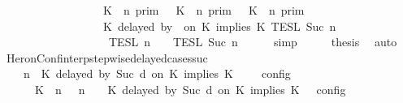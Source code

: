 \begin{isabellebody}
\ \ \ \ \ \ \ \ \ \ \ \ \ \ \ \ {\isasyminter}\ {\isacharparenleft}{\isasymlbrakk}\ K\ {\isasymnot}{\isasymUp}\ n\ {\isasymrbrakk}\isactrlsub p\isactrlsub r\isactrlsub i\isactrlsub m\ {\isasymunion}\ {\isacharparenleft}{\isasymlbrakk}\ K\ {\isasymUp}\ n\ {\isasymrbrakk}\isactrlsub p\isactrlsub r\isactrlsub i\isactrlsub m\ {\isasyminter}\ {\isasymlbrakk}\ K\ {\isasymUp}\ n\ {\isasymrbrakk}\isactrlsub p\isactrlsub r\isactrlsub i\isactrlsub m{\isacharparenright}{\isacharparenright}\isanewline
\ \ \ \ \ \ \ \ \ \ \ \ \ \ \ \ {\isasyminter}\ {\isasymlbrakk}\ K\ delayed\ by\ {}\ on\ K\ implies\ K\ {\isasymrbrakk}\isactrlsub T\isactrlsub E\isactrlsub S\isactrlsub L\isactrlbsup {\isasymge}\ Suc\ n\isactrlesup \isanewline
\ \ \ \ \ \ \ \ \ \ \ \ \ \ \ \ {\isasyminter}\ {\isasymlbrakk}{\isasymlbrakk}\ {\isasymPsi}\ {\isasymrbrakk}{\isasymrbrakk}\isactrlsub T\isactrlsub E\isactrlsub S\isactrlsub L\isactrlbsup {\isasymge}\ n\isactrlesup \ {\isasyminter}\ {\isasymlbrakk}{\isasymlbrakk}\ {\isasymPhi}\ {\isasymrbrakk}{\isasymrbrakk}\isactrlsub T\isactrlsub E\isactrlsub S\isactrlsub L\isactrlbsup {\isasymge}\ Suc\ n\isactrlesup {\isacartoucheclose}\isanewline
\ \ \ \ \isamarkupfalse%
\ simp\isanewline
\ \ \isamarkupfalse%
\ \isamarkupfalse%
\ {\isacharquery}thesis\ \isamarkupfalse%
\ auto\isanewline
{}\isamarkupfalse%
%
\endisatagproof
{\isafoldproof}%
%
\isadelimproof
\isanewline
%
\endisadelimproof
\isanewline
{}\isamarkupfalse%
\ HeronConf{\isacharunderscore}interp{\isacharunderscore}stepwise{\isacharunderscore}delayed{\isacharunderscore}cases{\isacharunderscore}suc{\isacharcolon}\isanewline
\ \ {\isacartoucheopen}{\isasymlbrakk}\ {\isasymGamma}{\isacharcomma}\ n\ {\isasymturnstile}\ {\isacharparenleft}{\isacharparenleft}K\ delayed\ by\ {\isacharparenleft}Suc\ d{\isacharparenright}\ on\ K\ implies\ K\ {\isacharhash}\ {\isasymPsi}{\isacharparenright}\ {\isasymtriangleright}\ {\isasymPhi}\ {\isasymrbrakk}\isactrlsub c\isactrlsub o\isactrlsub n\isactrlsub f\isactrlsub i\isactrlsub g\isanewline
\ \ \ \ {\isacharequal}\ {\isasymlbrakk}\ {\isacharparenleft}{\isacharparenleft}K\ {\isasymnot}{\isasymUp}\ n{\isacharparenright}\ {\isacharhash}\ {\isasymGamma}{\isacharparenright}{\isacharcomma}\ n\ {\isasymturnstile}\ {\isasymPsi}\ {\isasymtriangleright}\ {\isacharparenleft}{\isacharparenleft}K\ delayed\ by\ {\isacharparenleft}Suc\ d{\isacharparenright}\ on\ K\ implies\ K\ {\isacharhash}\ {\isasymPhi}{\isacharparenright}\ {\isasymrbrakk}\isactrlsub c\isactrlsub o\isactrlsub n\isactrlsub f\isactrlsub i\isactrlsub g\isanewline

\end{isabellebody}
